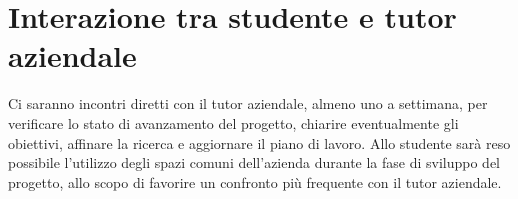 \section*{Interazione tra studente e tutor aziendale}
Ci saranno incontri diretti con il tutor aziendale, almeno uno a settimana, per verificare lo stato di avanzamento del progetto, chiarire eventualmente gli obiettivi, affinare la ricerca e aggiornare il piano di lavoro. Allo studente sarà reso possibile l'utilizzo degli spazi comuni dell'azienda durante la fase di sviluppo del progetto, allo scopo di favorire un confronto più frequente con il tutor aziendale.